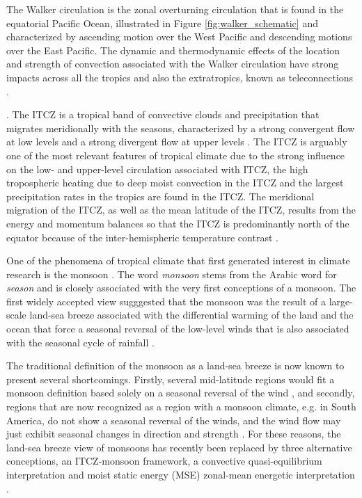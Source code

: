 The Walker circulation is the zonal overturning circulation that is found in the equatorial Pacific Ocean, illustrated in Figure \ref{fig:walker_schematic} and characterized by ascending motion over the West Pacific and descending motions over the East Pacific\citep{walker1924,bjerknes1969,gill1980}. The dynamic and thermodynamic effects of the location and strength of convection associated with the Walker circulation have strong impacts across all the tropics and also the extratropics, known as teleconnections \citep{cai2019pantropical}.

. The ITCZ is a tropical band of convective clouds and precipitation that migrates meridionally with the seasons, characterized by a strong convergent flow at low levels and a strong divergent flow at upper levels \citep{schneider2014}. The ITCZ is arguably one of the most relevant features of tropical climate due to the strong influence on the low- and upper-level circulation associated with ITCZ, the high tropospheric heating due to deep moist convection in the ITCZ and the largest precipitation rates in the tropics are found in the ITCZ.
The meridional migration of the ITCZ, as well as the mean latitude of the ITCZ, results from the energy and momentum balances so that the ITCZ is predominantly north of the equator because of the inter-hemispheric temperature contrast  \citep{donohoe2013,bischoff2016}.

One of the phenomena of tropical climate that first generated interest in climate research is the monsoon \citep{halley}. The word \textit{monsoon} stems from the Arabic word for \textit{season} and is closely associated with the very first conceptions of a monsoon. 
The first widely accepted view sugggested that the monsoon was the result of a large-scale land-sea breeze associated with the differential warming of the land and the ocean that force a seasonal reversal of the low-level winds that is also associated with the seasonal cycle of rainfall \citep{halley}. 

The traditional definition of the monsoon as a land-sea breeze is now known to present several shortcomings. Firstly, several mid-latitude regions would fit a monsoon definition based solely on a seasonal reversal of the wind \citep{gadgil2018}, and secondly, regions that are now recognized as a region with a monsoon climate, e.g. in South America, do not show a seasonal reversal of the winds, and the wind flow may just exhibit seasonal changes in direction and strength \citep{vera2006}. For these reasons, the land-sea breeze view of monsoons has recently been replaced by three alternative conceptions, an ITCZ-monsoon framework, a convective quasi-equilibrium interpretation and moist static energy (MSE) zonal-mean energetic interpretation \citep{biasutti2018global,hill2019,geen2020}. 

